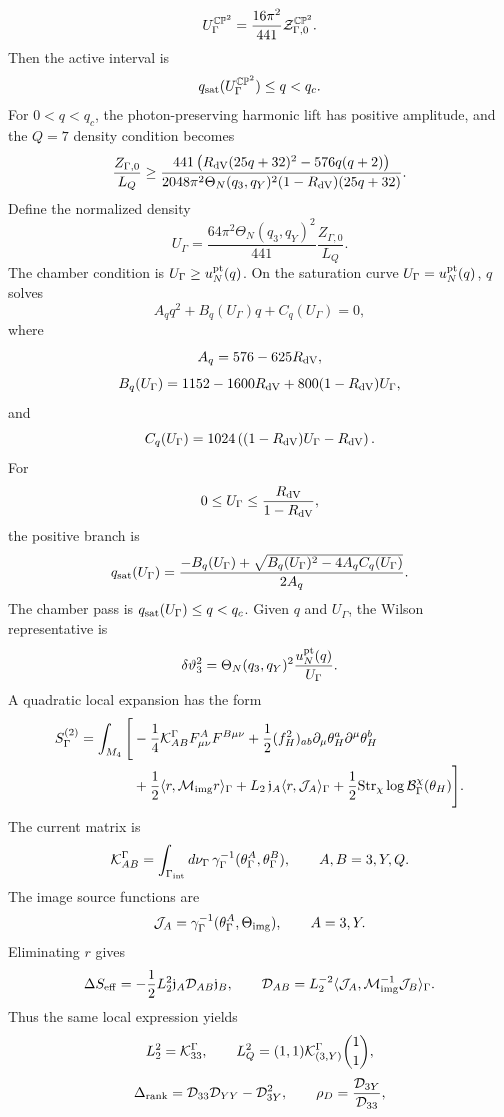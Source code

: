 \documentclass[11pt]{article}
\theoremstyle{definition}
\theoremstyle{remark}
\newcommand{\CP}{\mathbb{CP}}
\begin{document}
\[
  U_\Gamma^{\CP^2}
  =
  \frac{16\pi^2}{441}{\cal Z}_{\Gamma,0}^{\CP^2}.
\]
Then the active interval is
\[
  q_{\rm sat}(U_\Gamma^{\CP^2})\le q<q_c .
\]
For \(0<q<q_c\), the photon-preserving harmonic lift has positive
amplitude, and the \(Q=7\) density condition becomes
\[
  \frac{Z_{\Gamma,0}}{L_Q}
  \ge
  \frac{
  441\left(R_{\rm dV}(25q+32)^2-576q(q+2)\right)}
  {2048\pi^2\Theta_N(q_3,q_Y)^2(1-R_{\rm dV})(25q+32)} .
\]
Define the normalized density
\[
  U_\Gamma
  =
  \frac{64\pi^2\Theta_N(q_3,q_Y)^2}{441}
  \frac{Z_{\Gamma,0}}{L_Q}.
\]
The chamber condition is \(U_\Gamma\ge u_N^{\rm pt}(q)\).  On the saturation
curve \(U_\Gamma=u_N^{\rm pt}(q)\), \(q\) solves
\[
  A_q q^2+B_q(U_\Gamma)q+C_q(U_\Gamma)=0,
\]
where
\[
  A_q=576-625R_{\rm dV},
\]
\[
  B_q(U_\Gamma)
  =
  1152-1600R_{\rm dV}+800(1-R_{\rm dV})U_\Gamma,
\]
and
\[
  C_q(U_\Gamma)
  =
  1024\left((1-R_{\rm dV})U_\Gamma-R_{\rm dV}\right).
\]
For
\[
  0\le U_\Gamma\le \frac{R_{\rm dV}}{1-R_{\rm dV}},
\]
the positive branch is
\[
  q_{\rm sat}(U_\Gamma)
  =
  \frac{
  -B_q(U_\Gamma)
  +\sqrt{B_q(U_\Gamma)^2-4A_qC_q(U_\Gamma)}}
  {2A_q}.
\]
The chamber pass is \(q_{\rm sat}(U_\Gamma)\le q<q_c\).  Given \(q\) and
\(U_\Gamma\), the Wilson representative is
\[
  \delta\vartheta_3^2
  =
  \Theta_N(q_3,q_Y)^2
  \frac{u_N^{\rm pt}(q)}{U_\Gamma}.
\]
A quadratic local expansion has the form
\[
\begin{aligned}
S_\Gamma^{(2)}
=\int_{M_4}\Bigg[
&-\frac14{\cal K}_{AB}^\Gamma F_{\mu\nu}^AF^{B\mu\nu}
+\frac12(f_H^2)_{ab}
  \partial_\mu\theta_H^a\partial^\mu\theta_H^b\\
&+\frac12\langle r,{\cal M}_{\rm img}r\rangle_\Gamma
+L_2\,{\mathfrak j}_A
  \langle r,{\cal J}_A\rangle_\Gamma
+\frac12{\rm Str}_\chi\log{\cal B}_\Gamma^\chi(\theta_H)
\Bigg].
\end{aligned}
\]
The current matrix is
\[
  {\cal K}_{AB}^\Gamma
  =
  \int_{\Gamma_{\rm int}}d\nu_\Gamma\,
  \gamma_\Gamma^{-1}(\theta_\Gamma^A,\theta_\Gamma^B),
  \qquad A,B=3,Y,Q .
\]
The image source functions are
\[
  {\cal J}_A
  =
  \gamma_\Gamma^{-1}(\theta_\Gamma^A,\Theta_{\rm img}),
  \qquad A=3,Y .
\]
Eliminating \(r\) gives
\[
  \Delta S_{\rm eff}
  =
  -\frac12L_2^2{\mathfrak j}_A
  {\cal D}_{AB}{\mathfrak j}_B,
  \qquad
  {\cal D}_{AB}
  =
  L_2^{-2}
  \langle{\cal J}_A,
  {\cal M}_{\rm img}^{-1}{\cal J}_B\rangle_\Gamma .
\]
Thus the same local expression yields
\[
  L_2^2={\cal K}_{33}^\Gamma,
  \qquad
  L_Q^2=(1,1){\cal K}_{(3,Y)}^\Gamma\binom{1}{1},
\]
\[
  \Delta_{\rm rank}
  =
  {\cal D}_{33}{\cal D}_{YY}-{\cal D}_{3Y}^2,
  \qquad
  \rho_D=\frac{{\cal D}_{3Y}}{{\cal D}_{33}},
\]
\end{document}
